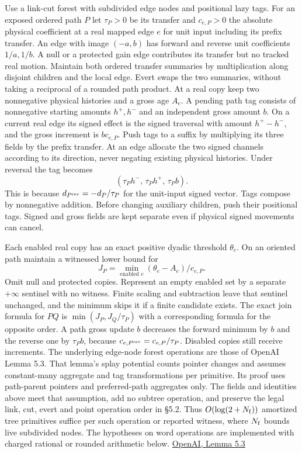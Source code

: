 \documentclass[11pt]{article}
\begin{document}
Use a link-cut forest with subdivided edge nodes and positional lazy tags. For an exposed ordered path \(P\) let \(\tau_P>0\) be its transfer and \(c_{e,P}>0\) the absolute physical coefficient at a real mapped edge \(e\) for unit input including its prefix transfer. An edge with image \((-a,b)\) has forward and reverse unit coefficients \(1/a,1/b\). A null or a protected gain edge contributes its transfer but no tracked real motion. Maintain both ordered transfer summaries by multiplication along disjoint children and the local edge. Evert swaps the two summaries, without taking a reciprocal of a rounded path product. At a real copy keep two nonnegative physical histories and a gross age \(A_e\). A pending path tag consists of nonnegative starting amounts \(h^+,h^-\) and an independent gross amount \(b\). On a current real edge its signed effect is the signed traversal with amount \(h^+-h^-\), and the gross increment is \(b c_{e,P}\). Push tags to a suffix by multiplying its three fields by the prefix transfer. At an edge allocate the two signed channels according to its direction, never negating existing physical histories. Under reversal the tag becomes
\[
   (\tau_P h^-,\,\tau_P h^+,\,\tau_P b).
\]
This is because \(d_{P^{\rm rev}}=-d_P/\tau_P\) for the unit-input signed vector. Tags compose by nonnegative addition. Before changing auxiliary children, push their positional tags. Signed and gross fields are kept separate even if physical signed movements can cancel.

Each enabled real copy has an exact positive dyadic threshold \(\theta_e\). On an oriented path maintain a witnessed lower bound for
\[
     J_P=\min_{\text{enabled }e}(\theta_e-A_e)/c_{e,P}.
\]
Omit null and protected copies. Represent an empty enabled set by a separate \(+\infty\) sentinel with no witness. Finite scaling and subtraction leave that sentinel unchanged, and the minimum skips it if a finite candidate exists. The exact join formula for \(PQ\) is \(\min(J_P,J_Q/\tau_P)\) with a corresponding formula for the opposite order. A path gross update \(b\) decreases the forward minimum by \(b\) and the reverse one by \(\tau_P b\), because \(c_{e,P^{\rm rev}}=c_{e,P}/\tau_P\). Disabled copies still receive increments. The underlying edge-node forest operations are those of OpenAI Lemma 5.3. That lemma's splay potential counts pointer changes and assumes constant-many aggregate and tag transformations per primitive. Its proof uses path-parent pointers and preferred-path aggregates only. The fields and identities above meet that assumption, add no subtree operation, and preserve the legal link, cut, evert and point operation order in §5.2. Thus \(O(\log(2+N_{\rm f}))\) amortized tree primitives suffice per such operation or reported witness, where \(N_{\rm f}\) bounds live subdivided nodes. The hypotheses on word operations are implemented with charged rational or rounded arithmetic below. \href{https://raw.githubusercontent.com/openai/math/adc7f1241b42e322a6451854ab7e4b4c146bf78a/preprints/Almost-Linear-Time-Maximum-Cardinality-Matching-in-Sparse-General-Graphs-September-24-2026/main.pdf\#page=37}{OpenAI, Lemma 5.3}
\end{document}
